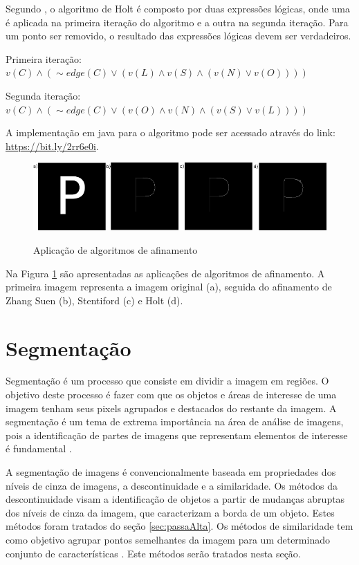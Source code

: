 \documentclass[
	12pt,				%
	oneside,			%
	a4paper,			%
	english,			%
	french,				%
	spanish,			%
	brazil,				%
	]{abntex2}
\begin{document}
Segundo \citet{guilherme:2007}, o algoritmo de Holt é composto por duas expressões lógicas, onde uma é aplicada na primeira iteração do algoritmo e a outra na segunda iteração. Para um ponto ser removido, o resultado das expressões lógicas devem ser verdadeiros.

Primeira iteração: 
\(v(C) \wedge (\sim edge(C) \vee (v(L) \wedge v(S) \wedge (v(N) \vee v(O))))\)

Segunda iteração:
\(v(C) \wedge (\sim edge(C) \vee (v(O) \wedge v(N) \wedge (v(S) \vee v(L))))\)

A implementação em java para o algoritmo pode ser acessado através do link: \url{https://bit.ly/2rr6e0i}. 

\begin{figure}[ht]
\centering
\caption{Aplicação de algoritmos de afinamento}
\includegraphics[width=1\textwidth]{imagens/esqueletizacao.png}
\sourceAuthor
\label{fig:esqueletizacao}
\end{figure}

Na Figura \ref{fig:esqueletizacao} são apresentadas as aplicações de algoritmos de afinamento. A primeira imagem representa a imagem original (a), seguida do afinamento de Zhang Suen (b), Stentiford (c) e Holt (d). 
   
\section{Segmentação}  

Segmentação é um processo que consiste em dividir a imagem em regiões. O objetivo deste processo é fazer com que os objetos e áreas de interesse de uma imagem tenham seus pixels agrupados e destacados do restante da imagem. A segmentação é um tema de extrema importância na área de análise de imagens, pois a identificação de partes de imagens que representam elementos de interesse é fundamental \cite{conciAzevedoLeta:2008}.  

A segmentação de imagens é convencionalmente baseada em propriedades dos níveis de cinza de imagens, a descontinuidade e a similaridade. Os métodos da descontinuidade visam a identificação de objetos a partir de mudanças abruptas dos níveis de cinza da imagem, que caracterizam a borda de um objeto. Estes métodos foram tratados do seção \ref{sec:passaAlta}. Os métodos de similaridade tem como objetivo agrupar pontos semelhantes da imagem para um determinado conjunto de características \cite{pedriniSchwartz:2008}. Este métodos serão tratados nesta seção.
    
\end{document}
